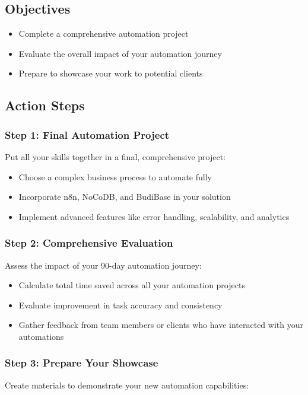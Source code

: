 \subsection{Objectives}
\begin{itemize}
    \item Complete a comprehensive automation project
    \item Evaluate the overall impact of your automation journey
    \item Prepare to showcase your work to potential clients
\end{itemize}

\subsection{Action Steps}

\subsubsection{Step 1: Final Automation Project}
Put all your skills together in a final, comprehensive project:

\begin{itemize}
    \item Choose a complex business process to automate fully
    \item Incorporate n8n, NoCoDB, and BudiBase in your solution
    \item Implement advanced features like error handling, scalability, and analytics
\end{itemize}

\subsubsection{Step 2: Comprehensive Evaluation}
Assess the impact of your 90-day automation journey:

\begin{itemize}
    \item Calculate total time saved across all your automation projects
    \item Evaluate improvement in task accuracy and consistency
    \item Gather feedback from team members or clients who have interacted with your automations
\end{itemize}

\subsubsection{Step 3: Prepare Your Showcase}
Create materials to demonstrate your new automation capabilities:

